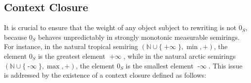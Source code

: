 \subsection{Context Closure}
\label{sec:context_closure}

It is crucial to ensure that the weight of any object subject to rewriting is not $0_S$, because \(0_S\) behaves unpredictably in strongly monotonic measurable semirings. For instance, in the natural tropical semiring \((\mathbb{N} \mathop{\cup} \{\mathop{+\infty}\}, \mathop{\min}, +)\), the element \(0_S\) is the greatest element \(\mathop{+\infty}\), while in the natural arctic semirings \((\mathbb{N} \mathop{\cup} \{\mathop{-\infty}\}, \max, +)\), the element \(0_S\) is the smallest element \(\mathop{-\infty}\).
This issue is addressed by the existence of a context closure defined as follows:


